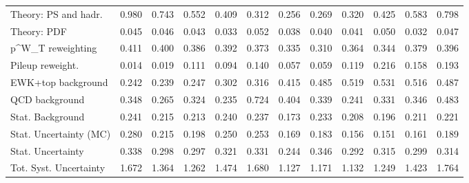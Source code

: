 \begin{tabular}{l|p{0.6cm}p{0.6cm}p{0.6cm}p{0.6cm}p{0.6cm}p{0.6cm}p{0.6cm}p{0.6cm}p{0.6cm}p{0.6cm}p{0.6cm}}
Theory: PS and hadr.                     & 0.980 & 0.743 & 0.552 & 0.409 & 0.312 & 0.256 & 0.269 & 0.320 & 0.425 & 0.583 & 0.798 \\
Theory: PDF                              & 0.045 & 0.046 & 0.043 & 0.033 & 0.052 & 0.038 & 0.040 & 0.041 & 0.050 & 0.032 & 0.047 \\
p^{W}_{T} reweighting                    & 0.411 & 0.400 & 0.386 & 0.392 & 0.373 & 0.335 & 0.310 & 0.364 & 0.344 & 0.379 & 0.396 \\
Pileup reweight.                         & 0.014 & 0.019 & 0.111 & 0.094 & 0.140 & 0.057 & 0.059 & 0.119 & 0.216 & 0.158 & 0.193 \\
EWK+top background                       & 0.242 & 0.239 & 0.247 & 0.302 & 0.316 & 0.415 & 0.485 & 0.519 & 0.531 & 0.516 & 0.487 \\
QCD background                           & 0.348 & 0.265 & 0.324 & 0.235 & 0.724 & 0.404 & 0.339 & 0.241 & 0.331 & 0.346 & 0.483 \\
Stat. Background                         & 0.241 & 0.215 & 0.213 & 0.240 & 0.237 & 0.173 & 0.233 & 0.208 & 0.196 & 0.211 & 0.221 \\
Stat. Uncertainty (MC)                   & 0.280 & 0.215 & 0.198 & 0.250 & 0.253 & 0.169 & 0.183 & 0.156 & 0.151 & 0.161 & 0.189 \\
\hline
Stat. Uncertainty                        & 0.338 & 0.298 & 0.297 & 0.321 & 0.331 & 0.244 & 0.346 & 0.292 & 0.315 & 0.299 & 0.314 \\
\hline
Tot. Syst. Uncertainty                   & 1.672 & 1.364 & 1.262 & 1.474 & 1.680 & 1.127 & 1.171 & 1.132 & 1.249 & 1.423 & 1.764 \\
\hline
\end{tabular}
